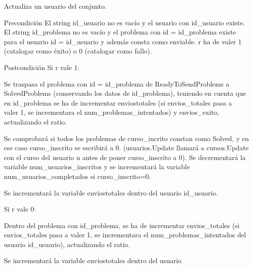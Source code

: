 Actualiza un usuario del conjunto. 

\begin{DoxyPrecond}{Precondición}
El string id\+\_\+usuario no es vacío y el usuario con id\+\_\+usuario existe. El string id\+\_\+problema no es vacío y el problema con id = id\+\_\+problema existe para el usuario id = id\+\_\+usuario y además consta como enviable. r ha de valer 1 (catalogar como éxito) o 0 (catalogar como fallo). 
\end{DoxyPrecond}
\begin{DoxyPostcond}{Postcondición}
Si r vale 1\+:
\begin{DoxyItemize}
\item Se traspasa el problema con id = id\+\_\+problema de Ready\+To\+Send\+Problems a Solved\+Problems (conservando los datos de id\+\_\+problema), teniendo en cuenta que en id\+\_\+problema se ha de incrementar enviostotales (si envios\+\_\+totales pasa a ~\newline
 valer 1, se incrementara el num\+\_\+problemas\+\_\+intentados) y envios\+\_\+exito, actualizando el ratio.
\item Se comprobará si todos los problemas de curso\+\_\+incrito constan como Solved, y en ese caso curso\+\_\+inscrito se escribirá a 0. (usuarios.\+Update llamará a cursos.\+Update con el curso del usuario u antes de poner curso\+\_\+inscrito a 0). Se decrementará la variable num\+\_\+usuarios\+\_\+inscritos y se incrementará la variable num\+\_\+usuarios\+\_\+completados si curso\+\_\+inscrito=0.
\item Se incrementará la variable enviostotales dentro del usuario id\+\_\+usuario.
\end{DoxyItemize}
\end{DoxyPostcond}
Si r vale 0\+:
\begin{DoxyItemize}
\item Dentro del problema con id\+\_\+problema, se ha de incrementar envios\+\_\+totales (si envios\+\_\+totales pasa a valer 1, se incrementara el num\+\_\+problemas\+\_\+intentados del usuario id\+\_\+usuario), actualizando el ratio.
\item Se incrementará la variable enviostotales dentro del usuario 
\end{DoxyItemize}\mbox{\label{class_user_set_a967c4fc4280fecb741abe4c9dc08cb59}} 
